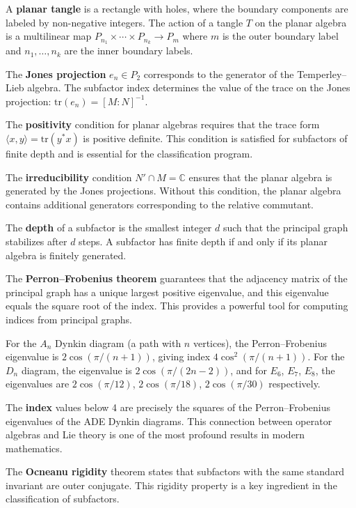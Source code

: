 A \textbf{planar tangle} is a rectangle with holes, where the boundary components are labeled by non-negative integers. The action of a tangle $T$ on the planar algebra is a multilinear map $P_{n_1} \times \cdots \times P_{n_k} \to P_m$ where $m$ is the outer boundary label and $n_1, \ldots, n_k$ are the inner boundary labels.

The \textbf{Jones projection} $e_n \in P_2$ corresponds to the generator of the Temperley--Lieb algebra. The subfactor index determines the value of the trace on the Jones projection: $\text{tr}(e_n) = [M:N]^{-1}$.

The \textbf{positivity} condition for planar algebras requires that the trace form $\langle x, y \rangle = \text{tr}(y^* x)$ is positive definite. This condition is satisfied for subfactors of finite depth and is essential for the classification program.

The \textbf{irreducibility} condition $N' \cap M = \mathbb{C}$ ensures that the planar algebra is generated by the Jones projections. Without this condition, the planar algebra contains additional generators corresponding to the relative commutant.

The \textbf{depth} of a subfactor is the smallest integer $d$ such that the principal graph stabilizes after $d$ steps. A subfactor has finite depth if and only if its planar algebra is finitely generated.

The \textbf{Perron--Frobenius theorem} guarantees that the adjacency matrix of the principal graph has a unique largest positive eigenvalue, and this eigenvalue equals the square root of the index. This provides a powerful tool for computing indices from principal graphs.

For the $A_n$ Dynkin diagram (a path with $n$ vertices), the Perron--Frobenius eigenvalue is $2\cos(\pi/(n+1))$, giving index $4\cos^2(\pi/(n+1))$. For the $D_n$ diagram, the eigenvalue is $2\cos(\pi/(2n-2))$, and for $E_6$, $E_7$, $E_8$, the eigenvalues are $2\cos(\pi/12)$, $2\cos(\pi/18)$, $2\cos(\pi/30)$ respectively.

The \textbf{index} values below 4 are precisely the squares of the Perron--Frobenius eigenvalues of the ADE Dynkin diagrams. This connection between operator algebras and Lie theory is one of the most profound results in modern mathematics.

The \textbf{Ocneanu rigidity} theorem states that subfactors with the same standard invariant are outer conjugate. This rigidity property is a key ingredient in the classification of subfactors.

